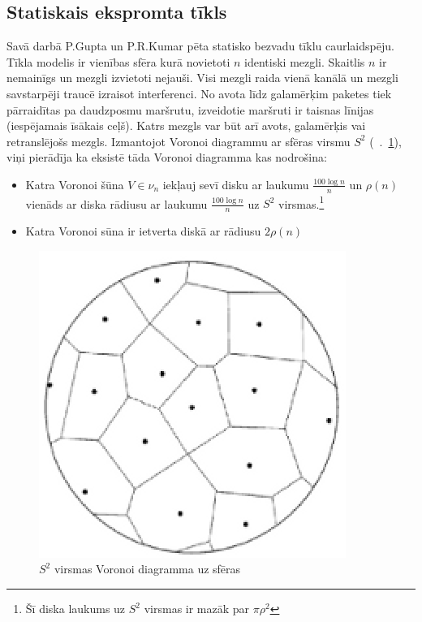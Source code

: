 \subsection{Statiskais ekspromta tīkls}
Savā darbā P.Gupta un P.R.Kumar \cite{gupta} pēta statisko bezvadu tīklu caurlaidspēju. Tīkla modelis ir vienības sfēra kurā novietoti $n$ identiski mezgli. Skaitlis $n$ ir nemainīgs un mezgli izvietoti nejauši. Visi mezgli raida vienā kanālā un mezgli savstarpēji traucē izraisot interferenci. No avota līdz galamērķim paketes tiek pārraidītas pa daudzposmu maršrutu, izveidotie maršruti ir taisnas līnijas (iespējamais īsākais ceļš). Katrs mezgls var būt arī avots, galamērķis vai retranslējošs mezgls. Izmantojot Voronoi diagrammu ar sfēras virsmu $S^2$ (\seename ~\figurename.~\ref{fig:voronoi}), viņi pierādīja ka eksistē tāda Voronoi diagramma kas nodrošina:
\begin{itemize}
 \item Katra Voronoi šūna $V \in \nu_{n}$ iekļauj sevī disku ar laukumu $\frac{100\log{n}}{n}$ un
 $\rho(n)$ vienāds ar diska rādiusu ar laukumu $\frac{100\log{n}}{n}$ uz $S^2$ virsmas.\footnote{Šī diska laukums uz $S^2$ virsmas ir mazāk par $\pi \rho^2$}
\item Katra Voronoi sūna ir ietverta diskā ar rādiusu $2\rho(n)$
\end{itemize}

\begin{figure}[htb!]
\centering%
\includegraphics{./graph/voronoi}
\caption{$S^2$ virsmas Voronoi diagramma uz sfēras \cite{gupta}}
\label{fig:voronoi}
\end{figure}

